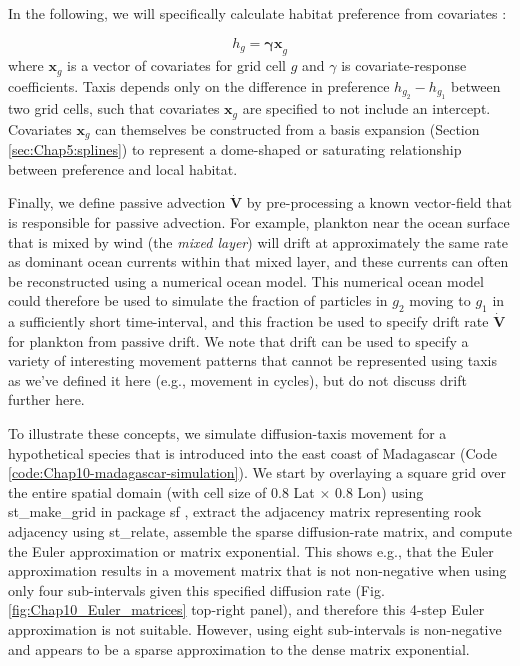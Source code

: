 In the following, we will specifically calculate habitat preference from covariates \cite{hooten_statistical_2010,thorson_estimating_2021}:

\begin{equation}
    h_g = \mathbf{ \gamma x }_g
\end{equation}
where \(\mathbf{x}_g\) is a vector of covariates for grid cell \(g\) and \(\gamma\) is covariate-response coefficients.  Taxis depends only on the difference in preference \(h_{g_2} - h_{g_1}\) between two grid cells, such that covariates \(\mathbf{x}_g\) are specified to not include an intercept.  Covariates \(\mathbf{ x }_g\) can themselves be constructed from a basis expansion (Section \ref{sec:Chap5:splines}) to represent a dome-shaped or saturating relationship between preference and local habitat. 

Finally, we define passive advection \( \dot{\mathbf{V}} \) by pre-processing a known vector-field that is responsible for passive advection.  For example, plankton near the ocean surface that is mixed by wind (the \textit{mixed layer}) will drift at approximately the same rate as dominant ocean currents within that mixed layer, and these currents can often be reconstructed using a numerical ocean model.  This numerical ocean model could therefore be used to simulate the fraction of particles in \(g_2\) moving to \(g_1\) in a sufficiently short time-interval, and this fraction be used to specify drift rate \( \dot{\mathbf{V}} \) for plankton from passive drift.  We note that drift can be used to specify a variety of interesting movement patterns that cannot be represented using taxis as we've defined it here (e.g., movement in cycles), but do not discuss drift further here.  

To illustrate these concepts, we simulate diffusion-taxis movement for a hypothetical species that is introduced into the east coast of Madagascar  (Code \ref{code:Chap10-madagascar-simulation}).  We start by overlaying a square grid over the entire spatial domain (with cell size of 0.8 Lat \(\times\) 0.8 Lon) using \colorbox{backcolour}{st\_make\_grid} in package \colorbox{backcolour}{sf} \cite{pebesma_simple_2018}, extract the adjacency matrix representing rook adjacency using \colorbox{backcolour}{st\_relate}, assemble the sparse diffusion-rate matrix, and compute the Euler approximation or matrix exponential.  This shows e.g., that the Euler approximation results in a movement matrix that is not non-negative when using only four sub-intervals given this specified diffusion rate (Fig. \ref{fig:Chap10_Euler_matrices} top-right panel), and therefore this 4-step Euler approximation is not suitable.  However, using eight sub-intervals is non-negative and appears to be a sparse approximation to the dense matrix exponential.   

